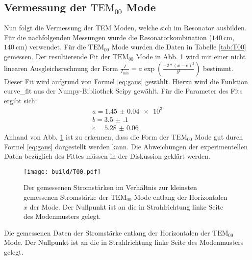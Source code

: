 \subsection{Vermessung der $\text{TEM}_{00}$ Mode}
Nun folgt die Vermessung der TEM Moden, welche sich im Resonator ausbilden. Für die nachfolgenden Messungen wurde die Resonatorkombination ($\SI{140}{\centi\meter}$,$\SI{140}{\centi\meter}$) verwendet.
Für die $\text{TEM}_\text{00}$ Mode wurden die Daten in Tabelle \ref{tab:T00} gemessen. Der resultierende Fit der $\text{TEM}_\text{00}$ Mode in Abb. \ref{fig:T00} wird mit einer nicht linearen Ausgleichsrechnung der Form $\frac{I}{I_\text{min}} = a \exp \left( \frac{-2*(x-c)^2}{b^2}\right)$
bestimmt. Dieser Fit wird aufgrund von Formel \eqref{eq:gaus} gewählt. Hierzu wird die Funktion curve\_fit aus der Numpy-Bibliothek Scipy \cite{scipy} gewählt. Für die Parameter des Fits ergibt sich:
\begin{gather*}
a = \num{1.45(4)e3}\\
b = \num{3.5(1)}\\
c = \num{5.28(6)}
\end{gather*}
Anhand von Abb. \ref{fig:T00} ist zu erkennen, dass die Form der $\text{TEM}_\text{00}$ Mode gut durch Formel \eqref{eq:gaus} dargestellt werden kann. Die Abweichungen der experimentellen Daten bezüglich des Fittes müssen in der Diskussion geklärt werden.



\begin{figure}
	\centering
	\texttt{[image: build/T00.pdf]}
	\caption{Der gemessenen Stromstärken im Verhältnis zur kleinsten gemessenen Stromstärke der $\text{TEM}_{00}$ Mode entlang der Horizontalen $x$ der Mode. Der Nullpunkt ist an die in Strahlrichtung linke Seite des Modenmusters gelegt.}
	\label{fig:T00}
\end{figure}

\begin{table}
	\centering
	\caption{Die gemessenen Daten der Stromstärke entlang der Horizontalen der $\text{TEM}_{\text{00}}$ Mode. Der Nullpunkt ist an die in Strahlrichtung linke Seite des Modenmusters gelegt.}
	
	\label{tab:T00}
\end{table}


